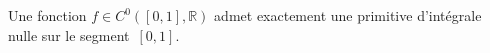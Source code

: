 Une fonction $f\in C^0([0,1],\mathbb{R})$ admet exactement une primitive d'intégrale nulle sur le segment~$[0,1]$.

\begin{reponses}
\end{reponses}

